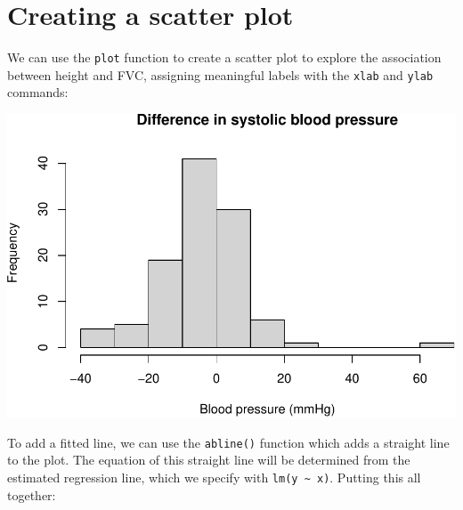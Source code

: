 \documentclass[
]{memoir}
\newenvironment{Shaded}{\begin{snugshade}}{\end{snugshade}}
\newcommand{\AttributeTok}[1]{\textcolor[rgb]{0.77,0.63,0.00}{#1}}
\newcommand{\FunctionTok}[1]{\textcolor[rgb]{0.00,0.00,0.00}{#1}}
\newcommand{\NormalTok}[1]{#1}
\newcommand{\SpecialCharTok}[1]{\textcolor[rgb]{0.00,0.00,0.00}{#1}}
\newcommand{\StringTok}[1]{\textcolor[rgb]{0.31,0.60,0.02}{#1}}
\begin{document}
\hypertarget{creating-a-scatter-plot}{%
\section{Creating a scatter plot}\label{creating-a-scatter-plot}}

We can use the \texttt{plot} function to create a scatter plot to explore the association between height and FVC, assigning meaningful labels with the \texttt{xlab} and \texttt{ylab} commands:

\begin{Shaded}
\end{Shaded}

\includegraphics{phcm9795-R-notes_files/figure-latex/unnamed-chunk-93-1.pdf}

To add a fitted line, we can use the \texttt{abline()} function which adds a straight line to the plot. The equation of this straight line will be determined from the estimated regression line, which we specify with \texttt{lm(y\ \textasciitilde{}\ x)}. Putting this all together:

\begin{Shaded}
\end{Shaded}
\end{document}
